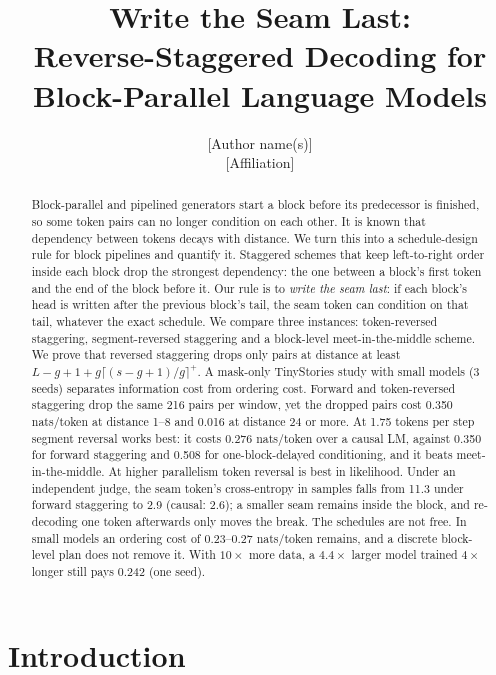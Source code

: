 \documentclass[11pt]{article}
\title{Write the Seam Last:\\Reverse-Staggered Decoding for Block-Parallel Language Models}
\author{[Author name(s)]\\[2pt]\small [Affiliation]}
\date{}
\theoremstyle{definition}
\theoremstyle{remark}
\begin{document}
\maketitle

\begin{abstract}
Block-parallel and pipelined generators start a block before its predecessor is finished, so some token pairs can no longer condition on each other.
It is known that dependency between tokens decays with distance.
We turn this into a schedule-design rule for block pipelines and quantify it.
Staggered schemes that keep left-to-right order inside each block drop the strongest dependency: the one between a block's first token and the end of the block before it.
Our rule is to \emph{write the seam last}: if each block's head is written after the previous block's tail, the seam token can condition on that tail, whatever the exact schedule.
We compare three instances: token-reversed staggering, segment-reversed staggering and a block-level meet-in-the-middle scheme.
We prove that reversed staggering drops only pairs at distance at least $L-g+1+g\lceil (s-g+1)/g\rceil^{+}$.
A mask-only TinyStories study with small models (3 seeds) separates information cost from ordering cost.
Forward and token-reversed staggering drop the same 216 pairs per window, yet the dropped pairs cost 0.350 nats/token at distance 1--8 and 0.016 at distance 24 or more.
At 1.75 tokens per step segment reversal works best: it costs 0.276 nats/token over a causal LM, against 0.350 for forward staggering and 0.508 for one-block-delayed conditioning, and it beats meet-in-the-middle. At higher parallelism token reversal is best in likelihood.
Under an independent judge, the seam token's cross-entropy in samples falls from 11.3 under forward staggering to 2.9 (causal: 2.6); a smaller seam remains inside the block, and re-decoding one token afterwards only moves the break.
The schedules are not free.
In small models an ordering cost of 0.23--0.27 nats/token remains, and a discrete block-level plan does not remove it.
With $10\times$ more data, a $4.4\times$ larger model trained $4\times$ longer still pays 0.242 (one seed).
\end{abstract}

\section{Introduction}
\label{sec:intro}
\end{document}
